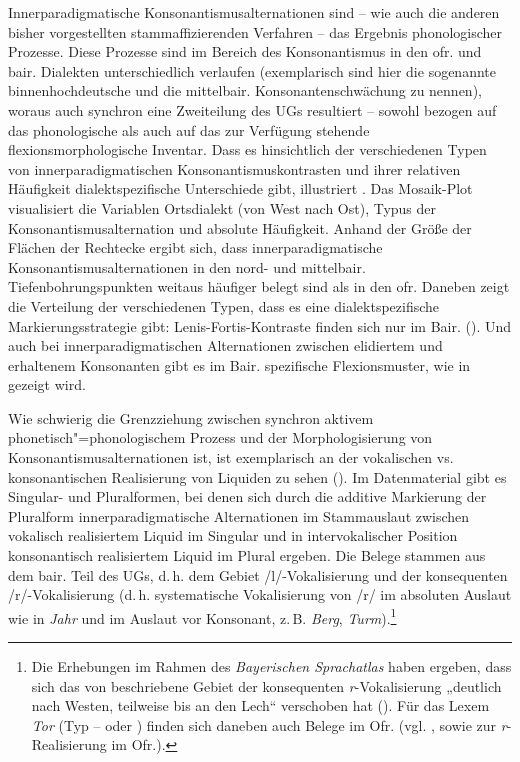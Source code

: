 Innerparadigmatische Konsonantismusalternationen sind -- wie auch die anderen bisher vorgestellten stammaffizierenden Verfahren -- das Ergebnis phonologischer Prozesse. Diese Prozesse sind im Bereich des Konsonantismus in den ofr. und bair. Dialekten unterschiedlich verlaufen (exemplarisch sind hier die sogenannte binnenhochdeutsche und die mittelbair. Konsonantenschwächung zu nennen), woraus auch synchron eine Zweiteilung des UGs resultiert -- sowohl bezogen auf das phonologische als auch auf das zur Verfügung stehende flexionsmorphologische Inventar. Dass es hinsichtlich der verschiedenen Typen von innerparadigmatischen Konsonantismuskontrasten und ihrer relativen Häufigkeit dialektspezifische Unterschiede gibt, illustriert . Das Mosaik-Plot visualisiert die Variablen Ortsdialekt (von West nach Ost), Typus der Konsonantismusalternation und absolute Häufigkeit. Anhand der Größe der Flächen der Rechtecke ergibt sich, dass innerparadigmatische Konsonantismusalternationen in den nord- und mittelbair. Tiefenbohrungspunkten weitaus häufiger belegt sind als in den ofr. Daneben zeigt die Verteilung der verschiedenen Typen, dass es eine dialektspezifische Markierungsstrategie gibt: Lenis-Fortis-Kontraste finden sich nur im Bair. (). Und auch bei innerparadigmatischen Alternationen zwischen elidiertem und erhaltenem Konsonanten gibt es im Bair. spezifische Flexionsmuster, wie in  gezeigt wird.

Wie schwierig die Grenzziehung zwischen synchron aktivem phonetisch"=phonologischem Prozess und der Morphologisierung von Konsonantismusalternationen ist, ist exemplarisch an der vokalischen vs. konsonantischen Realisierung von Liquiden zu sehen (). Im Datenmaterial gibt es Singular- und Pluralformen, bei denen sich durch die additive Markierung der Pluralform innerparadigmatische Alternationen im Stammauslaut zwischen vokalisch realisiertem Liquid im Singular und in intervokalischer Position konsonantisch realisiertem Liquid im Plural ergeben. Die Belege stammen aus dem bair. Teil des UGs, d.\,h. dem Gebiet /l/-Vokalisierung und der konsequenten /r/-Vokalisierung (d.\,h. systematische Vokalisierung von /r/ im absoluten Auslaut wie in \textit{Jahr} und im Auslaut vor Konsonant, z.\,B. \textit{Berg}, \textit{Turm}).\footnote{Die Erhebungen im Rahmen des \textit{Bayerischen Sprachatlas} haben ergeben, dass sich das von \citet{Kranzmayer1956} beschriebene Gebiet der konsequenten \textit{r}{}-Vokalisierung „deutlich nach Westen, teilweise bis an den Lech“ verschoben hat (\citealt[65]{RennKönig2006}). Für das Lexem \textit{Tor} (Typ  --  oder ) finden sich daneben auch Belege im Ofr. (vgl. \citealt[§34c4, §49c3 und Karte 26]{Kranzmayer1956}, \citealt[82]{Rowley1997} sowie \citealt[60--99]{SMF4} zur \textit{r}{}-Realisierung im Ofr.).}


